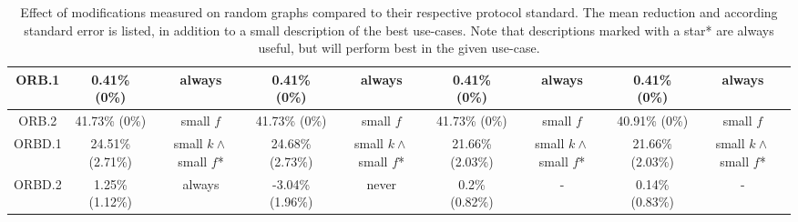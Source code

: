 \begin{table*}
{\begin{tabular}{c|cc|cc|cc|cc|}
\multicolumn{1}{|c|}{ORB.1}       & 0.41\% (0\%)            & always               & 0.41\% (0\%)             & always               & 0.41\% (0\%)            & always               & 0.41\% (0\%)             & always               \\ \hline
\multicolumn{1}{|c|}{ORB.2}       & 41.73\% (0\%)            & small $f$               & 41.73\% (0\%)             & small $f$               & 41.73\% (0\%)            & small $f$               & 40.91\% (0\%)             & small $f$               \\ \hline
\multicolumn{1}{|c|}{ORBD.1}      & 24.51\% (2.71\%)            & small $k \wedge$ small $f$*                & 24.68\% (2.73\%)             & small $k \wedge$ small $f$*                 & 21.66\% (2.03\%)            & small $k \wedge$ small $f$*                 & 21.66\% (2.03\%)             & small $k \wedge$ small $f$*                 \\ \hline
\multicolumn{1}{|c|}{ORBD.2}      & 1.25\% (1.12\%)            & always               & -3.04\% (1.96\%)             & never               & 0.2\% (0.82\%)            & -               & 0.14\% (0.83\%)             & -               \\ \hline
\end{tabular}
    }
  \caption{Effect of modifications measured on random graphs compared to their respective protocol standard. The mean reduction and according standard error is listed, in addition to a small description of the best use-cases. Note that descriptions marked with a star* are always useful, but will perform best in the given use-case.}
  \label{eval:individual-results}
\end{table*}

